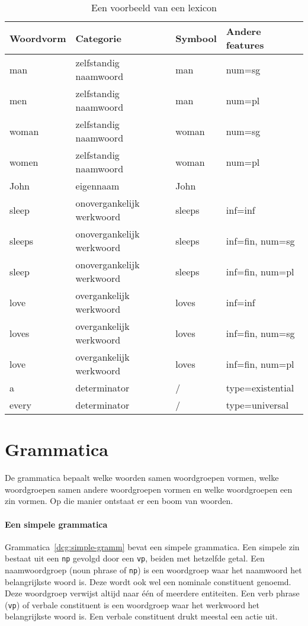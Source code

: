 \begin{table}[!]
  \centering
  \begin{tabular}{@{}llll@{}}
    \toprule
    \textbf{Woordvorm} & \textbf{Categorie} & \textbf{Symbool} & \textbf{Andere features} \\ \midrule
    man                & zelfstandig naamwoord     & man     & num=sg            \\
    men                & zelfstandig naamwoord     & man     & num=pl            \\
    woman              & zelfstandig naamwoord     & woman   & num=sg            \\
    women              & zelfstandig naamwoord     & woman   & num=pl            \\
    John               & eigennaam                 & John    &                   \\
    sleep              & onovergankelijk werkwoord & sleeps  & inf=inf           \\
    sleeps             & onovergankelijk werkwoord & sleeps  & inf=fin, num=sg   \\
    sleep              & onovergankelijk werkwoord & sleeps  & inf=fin, num=pl   \\
    love               & overgankelijk werkwoord   & loves   & inf=inf           \\
    loves              & overgankelijk werkwoord   & loves   & inf=fin, num=sg   \\
    love               & overgankelijk werkwoord   & loves   & inf=fin, num=pl   \\
    a                  & determinator              & /       & type=existential  \\
    every              & determinator              & /       & type=universal    \\
    \bottomrule
  \end{tabular}
  \caption{Een voorbeeld van een lexicon}
  \label{tbl:lexicon}
\end{table}

\section{Grammatica}
De grammatica bepaalt welke woorden samen woordgroepen vormen, welke woordgroepen samen andere woordgroepen vormen en welke woordgroepen een zin vormen. Op die manier ontstaat er een boom van woorden.

\paragraph{Een simpele grammatica} Grammatica~\ref{dcg:simple-gramm} bevat een simpele grammatica. Een simpele zin bestaat uit een \texttt{np} gevolgd door een \texttt{vp}, beiden met hetzelfde getal. Een naamwoordgroep (noun phrase of \texttt{np}) is een woordgroep waar het naamwoord het belangrijkste woord is. Deze wordt ook wel een nominale constituent genoemd. Deze woordgroep verwijst altijd naar één of meerdere entiteiten. Een verb phrase (\texttt{vp}) of verbale constituent is een woordgroep waar het werkwoord het belangrijkste woord is. Een verbale constituent drukt meestal een actie uit.

